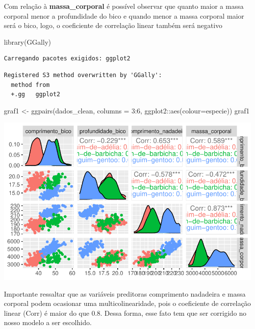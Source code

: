 \documentclass[
  letterpaper,
  DIV=11,
  numbers=noendperiod]{scrartcl}
\newenvironment{Shaded}{\begin{snugshade}}{\end{snugshade}}
\newcommand{\AttributeTok}[1]{\textcolor[rgb]{0.40,0.45,0.13}{#1}}
\newcommand{\DecValTok}[1]{\textcolor[rgb]{0.68,0.00,0.00}{#1}}
\newcommand{\FunctionTok}[1]{\textcolor[rgb]{0.28,0.35,0.67}{#1}}
\newcommand{\NormalTok}[1]{\textcolor[rgb]{0.00,0.23,0.31}{#1}}
\newcommand{\OtherTok}[1]{\textcolor[rgb]{0.00,0.23,0.31}{#1}}
\newcommand{\SpecialCharTok}[1]{\textcolor[rgb]{0.37,0.37,0.37}{#1}}
\begin{document}
Com relação à \textbf{massa\_corporal} é possível observar que quanto
maior a massa corporal menor a profundidade do bico e quando menor a
massa corporal maior será o bico, logo, o coeficiente de correlação
linear também será negativo

\begin{Shaded}
\begin{Highlighting}[]
\FunctionTok{library}\NormalTok{(GGally)}
\end{Highlighting}
\end{Shaded}

\begin{verbatim}
Carregando pacotes exigidos: ggplot2
\end{verbatim}

\begin{verbatim}
Registered S3 method overwritten by 'GGally':
  method from   
  +.gg   ggplot2
\end{verbatim}

\begin{Shaded}
\begin{Highlighting}[]
\NormalTok{graf1 }\OtherTok{\textless{}{-}} \FunctionTok{ggpairs}\NormalTok{(dados\_clean, }\AttributeTok{columns =} \DecValTok{3}\SpecialCharTok{:}\DecValTok{6}\NormalTok{, ggplot2}\SpecialCharTok{::}\FunctionTok{aes}\NormalTok{(}\AttributeTok{colour=}\NormalTok{especie))}
\NormalTok{graf1}
\end{Highlighting}
\end{Shaded}

\includegraphics{r_files/figure-pdf/unnamed-chunk-5-1.pdf}

Importante ressaltar que as variáveis preditoras comprimento nadadeira e
massa corporal podem ocasionar uma multicolinearidade, pois o
coeficiente de correlação linear (Corr) é maior do que 0.8. Dessa forma,
esse fato tem que ser corrigido no nosso modelo a ser escolhido.
\end{document}
